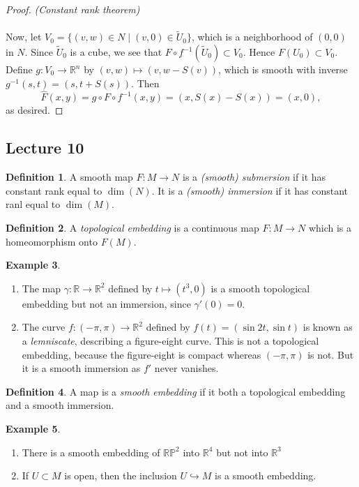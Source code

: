 \documentclass[10pt,letterpaper,cm]{nupset}
\theoremstyle{definition}
\newtheorem{definition}{Definition}[subsection]
\newtheorem{exmp}[definition]{Example}
\theoremstyle{theorem}
\theoremstyle{remark}
\newcommand{\R}{\mathbb R}
\newcommand{\RP}{\mathbb{RP}}
\newcommand{\1}{\mathbf{1}}
\newcommand{\0}{\vec 0}
\begin{document}
\begin{proof}{\textit{(Constant rank theorem)}}
\\ \\ Now, let $V_0 = \{(v,w) \in N \mid (v,0)\in \widetilde{U}_0\}$, which is a neighborhood of $(0,0)$ in  $N$. Since $\widetilde{U}_0$ is a cube, we see that $F \circ f^{-1}(\widetilde{U}_0) \subset V_0$. Hence $F(U_0) \subset V_0$.  Define $g : V_0 \to \R^n$ by $(v,w) \mapsto (v, w-S(v))$, which is smooth with inverse $g^{-1}(s,t) = (s, t + S(s))$. Then $$\widehat{F}(x,y) = g \circ F \circ f^{-1}(x,y) = (x, S(x) - S(x)) = (x,0),$$ as desired.
\end{proof}

\subsection{Lecture 10}

\begin{definition}
A smooth map $F: M \to N$ is a \textit{(smooth) submersion} if it has constant rank equal to $\dim(N)$. It is a \textit{(smooth) immersion} if it has constant ranl equal to $\dim(M)$.
\end{definition}

\begin{definition}
A \textit{topological embedding} is a continuous map $F: M \to N$ which is a homeomorphism onto $F(M)$.
\end{definition}

\begin{exmp} $ $
\begin{enumerate}
\item The map $\gamma: \R \to \R^2$ defined by $t\mapsto (t^3, 0)$ is a smooth topological embedding but not an immersion, since $\gamma'(0) =0$.
\item The curve $f: (-\pi, \pi) \to \R^2$ defined by $f(t) = (\sin 2t , \sin t)$ is known as a \textit{lemniscate}, describing a figure-eight curve. This is not a topological embedding, because the figure-eight is compact whereas $(-\pi, \pi)$ is not. But it is a smooth immersion as $f'$ never vanishes. 
\end{enumerate}
\end{exmp}

\begin{definition}
A map is a \textit{smooth embedding} if it both a topological embedding and a smooth immersion.
\end{definition}

\begin{exmp} $ $
\begin{enumerate}
\item There is a smooth embedding of $\RP^2$ into $\R^4$ but not into $\R^3$
\item If $U \subset M$ is open, then the inclusion $U \hookrightarrow M$ is a smooth embedding.
\end{enumerate}
\end{exmp}
\end{document}
